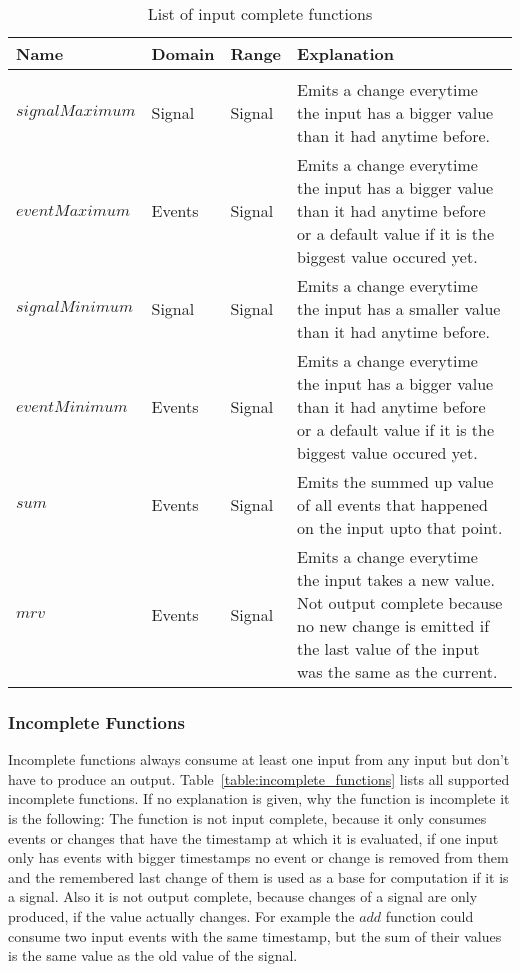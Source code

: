 \begin{table}[htb]
  \begin{tabularx}{\textwidth}{lllX}
    Name                 & Domain  & Range   & Explanation \\
    \toprule \\
    \(\mathit{signalMaximum}\)    & Signal  & Signal  & Emits a change everytime the input has a bigger value than it had anytime before. \\
    \(\mathit{eventMaximum}\)     & Events  & Signal  & Emits a change everytime the input has a bigger value than it had anytime before or a default value if it is the biggest value occured yet. \\
    \(\mathit{signalMinimum}\)    & Signal  & Signal  & Emits a change everytime the input has a smaller value than it had anytime before. \\
    \(\mathit{eventMinimum}\)     & Events  & Signal  & Emits a change everytime the input has a bigger value than it had anytime before or a default value if it is the biggest value occured yet. \\
    \(\mathit{sum}\)              & Events  & Signal  & Emits the summed up value of all events that happened on the input upto that point. \\
    \(\mathit{mrv}\)              & Events  & Signal  & Emits a change everytime the input takes a new value. Not output complete because no new change is emitted if the last value of the input was the same as the current.
  \end{tabularx}
\caption{List of input complete functions}
\label{table:input_complete_functions}
\end{table}


\subsubsection{Incomplete Functions}
Incomplete functions always consume at least one input from any input but don't have to produce an output.
Table~\ref{table:incomplete_functions} lists all supported incomplete functions.
If no explanation is given, why the function is incomplete it is the following:
The function is not input complete, because it only consumes events or changes that have the timestamp at which it is evaluated, if one input only has events with bigger timestamps no event or change is removed from them and the remembered last change of them is used as a base for computation if it is a signal.
Also it is not output complete, because changes of a signal are only produced, if the value actually changes.
For example the \(\mathit{add}\) function could consume two input events with the same timestamp, but the sum of their values is the same value as the old value of the signal.


